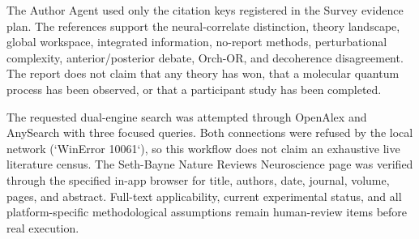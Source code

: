 \documentclass[conference]{IEEEtran}
\begin{document}
The Author Agent used only the citation keys registered in the Survey evidence plan. The references support the neural-correlate distinction, theory landscape, global workspace, integrated information, no-report methods, perturbational complexity, anterior/posterior debate, Orch-OR, and decoherence disagreement. The report does not claim that any theory has won, that a molecular quantum process has been observed, or that a participant study has been completed.

The requested dual-engine search was attempted through OpenAlex and AnySearch with three focused queries. Both connections were refused by the local network (`WinError 10061`), so this workflow does not claim an exhaustive live literature census. The Seth-Bayne Nature Reviews Neuroscience page was verified through the specified in-app browser for title, authors, date, journal, volume, pages, and abstract. Full-text applicability, current experimental status, and all platform-specific methodological assumptions remain human-review items before real execution.
\end{document}
